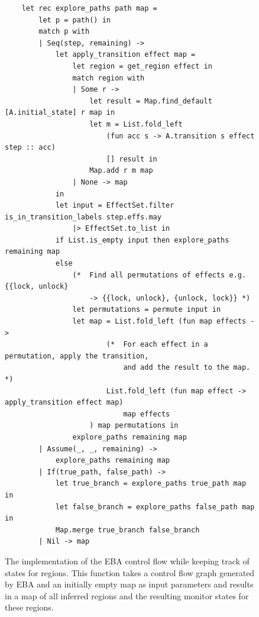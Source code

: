 
\begin{figure}[H]
    \centering
    \begin{verbatim}
    let rec explore_paths path map = 
        let p = path() in
        match p with
        | Seq(step, remaining) -> 
            let apply_transition effect map = 
                let region = get_region effect in 
                match region with 
                | Some r -> 
                    let result = Map.find_default [A.initial_state] r map in 
                    let m = List.fold_left 
                        (fun acc s -> A.transition s effect step :: acc)
                        [] result in
                    Map.add r m map
                | None -> map
            in
            let input = EffectSet.filter is_in_transition_labels step.effs.may 
                |> EffectSet.to_list in
            if List.is_empty input then explore_paths remaining map 
            else 
                (*  Find all permutations of effects e.g. {{lock, unlock} 
                    -> {{lock, unlock}, {unlock, lock}} *)
                let permutations = permute input in 
                let map = List.fold_left (fun map effects ->
                        (*  For each effect in a permutation, apply the transition, 
                            and add the result to the map. *)
                        List.fold_left (fun map effect -> apply_transition effect map) 
                            map effects
                    ) map permutations in
                explore_paths remaining map
        | Assume(_, _, remaining) -> 
            explore_paths remaining map
        | If(true_path, false_path) -> 
            let true_branch = explore_paths true_path map in
            let false_branch = explore_paths false_path map in 
            Map.merge true_branch false_branch
        | Nil -> map
    \end{verbatim}
    \caption{The implementation of the EBA control flow while keeping track of states for regions. This function takes a control flow graph generated by EBA and an initially empty map as input parameters and results in a map of all inferred regions and the resulting monitor states for these regions.}
    \label{explore_tree-implementation}
\end{figure}



